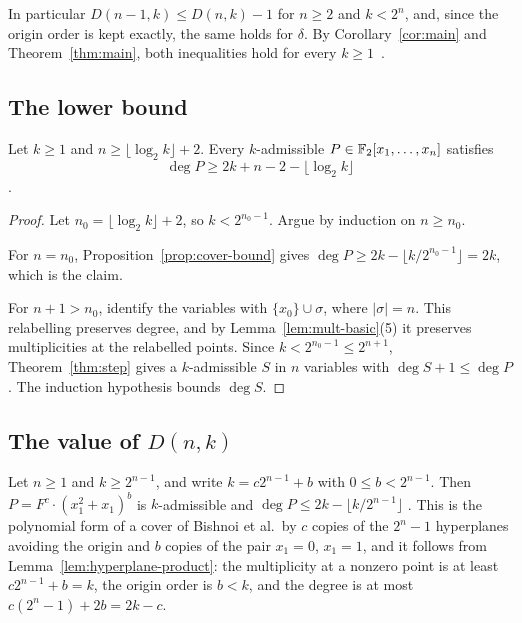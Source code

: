 \begin{remark}\label{rem:dimension-step}
In particular \(D(n-1,k)\le D(n,k)-1\) for \(n\ge2\) and \(k<2^n\), and, since
the origin order is kept exactly, the same holds for \(\delta\). By
Corollary~\ref{cor:main} and Theorem~\ref{thm:main}, both inequalities hold for
every \(k\ge1\)
\textnormal{\small{}\,}.
\end{remark}

\subsection{The lower bound}

\begin{theorem}\label{thm:lower}
Let \(k\ge1\) and \(n\ge\lfloor\log_2k\rfloor+2\). Every \(k\)-admissible
\(P\in\mathbb F_2[x_1,\ldots,x_n]\) satisfies
\[
 \deg P\ge2k+n-2-\lfloor\log_2k\rfloor
\]
.
\end{theorem}

\begin{proof}
Let \(n_0=\lfloor\log_2k\rfloor+2\), so \(k<2^{n_0-1}\). Argue by induction on \(n\ge n_0\).

For \(n=n_0\), Proposition~\ref{prop:cover-bound} gives
\(\deg P\ge2k-\lfloor k/2^{n_0-1}\rfloor=2k\), which is the claim.

For \(n+1>n_0\), identify the variables with \(\{x_0\}\cup\sigma\), where \(|\sigma|=n\).
This relabelling preserves degree, and by Lemma~\ref{lem:mult-basic}(5) it
preserves multiplicities at the relabelled points. Since
\(k<2^{n_0-1}\le2^{n+1}\), Theorem~\ref{thm:step} gives a \(k\)-admissible \(S\) in
\(n\) variables with \(\deg S+1\le\deg P\). The induction hypothesis bounds
\(\deg S\).
\end{proof}

\subsection{The value of \texorpdfstring{\(D(n,k)\)}{D(n,k)}}

\begin{remark}\label{rem:hyperplane}
Let \(n\ge1\) and \(k\ge2^{n-1}\), and write \(k=c2^{n-1}+b\) with
\(0\le b<2^{n-1}\). Then \(P=F^c\cdot(x_1^2+x_1)^b\) is \(k\)-admissible and
\(\deg P\le2k-\lfloor k/2^{n-1}\rfloor\)
. This is the polynomial
form of a cover of Bishnoi et al.\ by \(c\) copies of the \(2^n-1\) hyperplanes
avoiding the origin and \(b\) copies of the pair \(x_1=0\), \(x_1=1\), and it
follows from Lemma~\ref{lem:hyperplane-product}: the multiplicity at a nonzero
point is at least \(c2^{n-1}+b=k\), the origin order is \(b<k\), and the degree
is at most \(c(2^n-1)+2b=2k-c\).
\end{remark}


